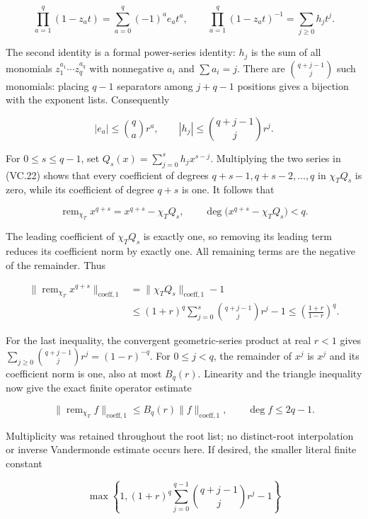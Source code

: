 \[
 \prod_{a=1}^q(1-z_at)=\sum_{a=0}^q(-1)^ae_at^a,
 \qquad
 \prod_{a=1}^q(1-z_at)^{-1}=\sum_{j\ge0}h_jt^j.
\tag{VC.22}
\]

The second identity is a formal power-series identity: \(h_j\) is the sum of all monomials \(z_1^{a_1}\cdots z_q^{a_q}\) with nonnegative \(a_i\) and \(\sum a_i=j\). There are \(\binom{q+j-1}{j}\) such monomials: placing \(q-1\) separators among \(j+q-1\) positions gives a bijection with the exponent lists. Consequently

\[
 |e_a|\le\binom qa r^a,\qquad
 |h_j|\le\binom{q+j-1}{j}r^j.
\tag{VC.23}
\]

For \(0\le s\le q-1\), set \(Q_s(x)=\sum_{j=0}^sh_jx^{s-j}\). Multiplying the two series in (VC.22) shows that every coefficient of degrees \(q+s-1,q+s-2,\ldots,q\) in \(\chi_TQ_s\) is zero, while its coefficient of degree \(q+s\) is one. It follows that

\[
 \operatorname{rem}_{\chi_T}x^{q+s}=x^{q+s}-\chi_TQ_s,
 \qquad \deg\bigl(x^{q+s}-\chi_TQ_s\bigr)<q.
\tag{VC.24}
\]

The leading coefficient of \(\chi_TQ_s\) is exactly one, so removing its leading term reduces its coefficient norm by exactly one. All remaining terms are the negative of the remainder. Thus

\[
\begin{split}
 \|\operatorname{rem}_{\chi_T}x^{q+s}\|_{\mathrm{coeff},1}
 &=\|\chi_TQ_s\|_{\mathrm{coeff},1}-1\\
 &\le(1+r)^q\sum_{j=0}^s\binom{q+j-1}{j}r^j-1
 \le\left(\frac{1+r}{1-r}\right)^q.
\end{split}
\tag{VC.25}
\]

For the last inequality, the convergent geometric-series product at real \(r<1\) gives \(\sum_{j\ge0}\binom{q+j-1}{j}r^j=(1-r)^{-q}\). For \(0\le j<q\), the remainder of \(x^j\) is \(x^j\) and its coefficient norm is one, also at most \(B_q(r)\). Linearity and the triangle inequality now give the exact finite operator estimate

\[
 \|\operatorname{rem}_{\chi_T}f\|_{\mathrm{coeff},1}
 \le B_q(r)\|f\|_{\mathrm{coeff},1},\qquad \deg f\le2q-1.
\tag{VC.26}
\]

Multiplicity was retained throughout the root list; no distinct-root interpolation or inverse Vandermonde estimate occurs here. If desired, the smaller literal finite constant

\[
 \max\left\{1,(1+r)^q
       \sum_{j=0}^{q-1}\binom{q+j-1}{j}r^j-1\right\}
\tag{VC.27}
\]

